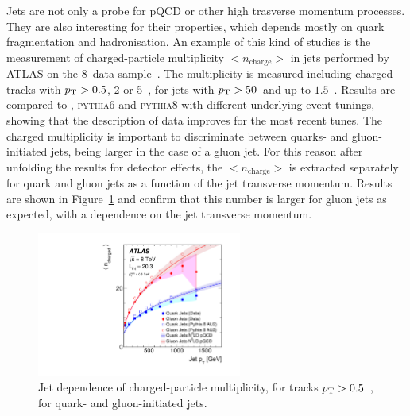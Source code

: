 \documentclass{PoS}
\providecommand{\PYTHIAS} {{\textsc{pythia6}}\xspace}
\providecommand{\PYTHIAE} {{\textsc{pythia8}}\xspace}
\begin{document}
Jets are not only a probe for pQCD or other high trasverse momentum processes. They are also interesting for their
properties, which depends mostly on quark fragmentation and hadronisation. An example of this kind of studies is the
measurement of charged-particle multiplicity $<n_\mathrm{charge}>$ in jets performed by ATLAS on the 8~\TeV data sample~\cite{Aad:2016oit}.
The multiplicity is measured including charged tracks with $p_{\mathrm{T}} > 0.5$, 2 or 5~\GeV, for jets with $p_{\mathrm{T}} > 50$~\GeV and up to
$1.5$~\TeV. Results are compared to \HERWIGpp, \PYTHIAS and \PYTHIAE with different underlying event tunings, showing
that the description of data improves for the most recent tunes. 
The charged multiplicity is important to discriminate between quarks- and gluon-initiated jets, being larger in the case
of a gluon jet. For this reason after unfolding the results for detector effects, the  $<n_\mathrm{charge}>$ is
extracted separately for quark and gluon jets as a function of the jet transverse momentum. Results are shown in
Figure~\ref{fig:chargemult} and confirm that this number is larger for gluon jets as expected, with a dependence on the jet transverse
momentum.

\begin{figure}[hbtp]
  \centering
  \includegraphics[width=0.6\textwidth]{Figure9.pdf}
  \caption{Jet \pt dependence of charged-particle multiplicity, for tracks $p_{\mathrm{T}} > 0.5$~\GeV, for quark- and
    gluon-initiated jets.}
  \label{fig:chargemult}
\end{figure}
\end{document}
